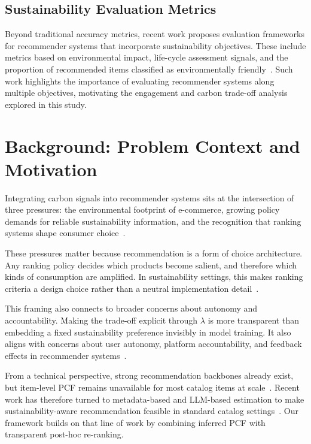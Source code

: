 \documentclass[11pt]{article}
\begin{document}
\subsection{Sustainability Evaluation Metrics}

Beyond traditional accuracy metrics, recent work proposes evaluation frameworks for
recommender systems that incorporate sustainability objectives. These include metrics based
on environmental impact, life-cycle assessment signals, and the proportion of recommended
items classified as environmentally friendly~\cite{felfernig2025sustainability}. Such work
highlights the importance of evaluating recommender systems along multiple objectives,
motivating the engagement and carbon trade-off analysis explored in this study.


\section{Background: Problem Context and Motivation}
\label{sec:background}

Integrating carbon signals into recommender systems sits at the intersection of three
pressures: the environmental footprint of e-commerce, growing policy demands for reliable
sustainability information, and the recognition that ranking systems shape consumer
choice~\cite{buldeorai2023ecommerce, koundouri2024greendeal, eu2024825,
jesse2021digitalnudging}.

These pressures matter because recommendation is a form of choice architecture. Any ranking
policy decides which products become salient, and therefore which kinds of consumption are
amplified. In sustainability settings, this makes ranking criteria a design choice rather
than a neutral implementation detail~\cite{jesse2021digitalnudging, halimeh2026nudging}.

This framing also connects to broader concerns about autonomy and accountability. Making the
trade-off explicit through $\lambda$ is more transparent than embedding a fixed
sustainability preference invisibly in model training. It also aligns with concerns about
user autonomy, platform accountability, and feedback effects in recommender
systems~\cite{bonicalzi2023autonomy, dsa2022, chaney2018confounding}.

From a technical perspective, strong recommendation backbones already exist, but item-level
PCF remains unavailable for most catalog items at scale~\cite{recbole2021,
meinrenken2022carboncatalogue}. Recent work has therefore turned to metadata-based and
LLM-based estimation to make sustainability-aware recommendation feasible in standard
catalog settings~\cite{vicenti2026pcfllm, ecoa2026}. Our framework builds on that line of
work by combining inferred PCF with transparent post-hoc re-ranking.
\end{document}
